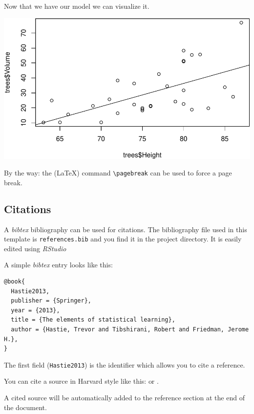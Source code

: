 \documentclass[11pt,a4paper]{article}
\let\origfigure\figure
\let\endorigfigure\endfigure
\renewenvironment{figure}[1][2] {
    \expandafter\origfigure\expandafter[H]
} {
    \endorigfigure
}
\begin{document}
Now that we have our model we can visualize it.

\begin{figure}
\centering
\includegraphics{Seminararbeit_files/figure-latex/unnamed-chunk-4-1.pdf}
\caption{Dataset and regression}
\end{figure}

By the way: the (\LaTeX) command \texttt{\textbackslash{}pagebreak} can
be used to force a page break.

\pagebreak

\hypertarget{citations}{%
\subsection{Citations}\label{citations}}

A \emph{bibtex} bibliography can be used for citations. The bibliography
file used in this template is \texttt{references.bib} and you find it in
the project directory. It is easily edited using \emph{RStudio}

A simple \emph{bibtex} entry looks like this:

\begin{verbatim}
@book{
  Hastie2013,
  publisher = {Springer},
  year = {2013},
  title = {The elements of statistical learning},
  author = {Hastie, Trevor and Tibshirani, Robert and Friedman, Jerome H.},
}
\end{verbatim}

The first field (\texttt{Hastie2013}) is the identifier which allows you
to cite a reference.

You can cite a source in Harvard style like this: \autocite{Hastie2013}
or \textcite{Hastie2013}.

A cited source will be automatically added to the reference section at
the end of the document.
\end{document}
